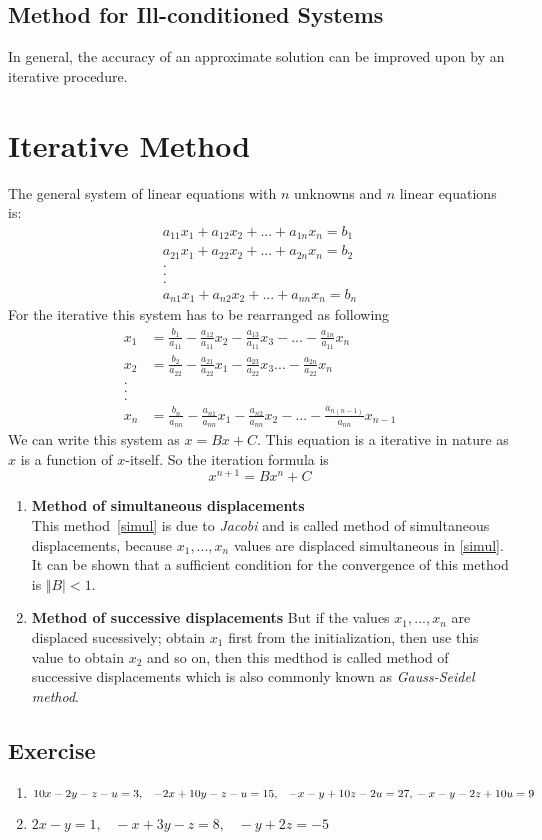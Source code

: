 \documentclass[aima203_lecturenotes_ku.tex]{subfiles}
\begin{document}
  \subsection{Method for Ill-conditioned Systems}
  In general, the accuracy of an approximate solution can be improved upon by an iterative procedure.

\section{Iterative Method}
The general system of linear equations with $n$ unknowns and $n$ linear equations is:
\begin{gather*}
    a_{11}x_1+a_{12}x_2+...+a_{1n}x_n=b_1 \\
    a_{21}x_1+a_{22}x_2+...+a_{2n}x_n=b_2 \\
    .\\
    .\\
    .\\
    a_{n1}x_1+a_{n2}x_2+...+a_{nn}x_n=b_n
  \end{gather*}
  For the iterative this system has to be rearranged as following
  \begin{align*}
    x_1 &= \frac{b_1}{a_{11}} - \frac{a_{12}}{a_{11}}x_2-\frac{a_{13}}{a_{11}}x_3-...-\frac{a_{1n}}{a_{11}}x_n \\
    x_2 &= \frac{b_2}{a_{22}} -\frac{a_{21}}{a_{22}}x_1-\frac{a_{23}}{a_{22}}x_3 ...-\frac{a_{2n}}{a_{22}}x_n \\
    .\\
    .\\
    .\\
    x_n &= \frac{b_n}{a_{nn}} - \frac{a_{n1}}{a_{nn}}x_1-\frac{a_{n2}}{a_{nn}}x_2-...-\frac{a_{n(n-1)}}{a_{nn}}x_{n-1}
  \end{align*}
  We can write this system as $x=Bx+C$. This equation is a iterative in nature as $x$ is a function of $x$-itself.
  So the iteration formula is
  \begin{equation}
    \label{simul}
    x^{n+1} = Bx^{n} + C
  \end{equation}
  \begin{enumerate}
  \item \textbf{Method of simultaneous displacements} \\[1mm]
    This method~\ref{simul} is due to \textit{Jacobi} and is called method of simultaneous displacements, because $x_1, ..., x_n$ values are displaced simultaneous in \ref{simul}. It can be shown that a sufficient condition for the convergence of this method is $\Vert B \vert < 1$.
 \item \textbf{Method of successive displacements} But if the values $x_1,...,x_n$ are displaced sucessively; obtain $x_1$ first from the initialization, then use this value to obtain $x_2$ and so on, then this medthod is called method of successive displacements which is also commonly known as \textit{Gauss-Seidel method}.
 \end{enumerate}

 \subsection{Exercise}
 \begin{enumerate}
 \item $10x-2y-z-u=3, \;\;\; -2x+10y-z-u = 15, \;\;\; -x-y+10z-2u=27, \\ -x-y-2z+10u = 9$
   \item $2x-y=1, \;\;\; -x+3y-z = 8, \;\;\; -y+2z=-5$
 \end{enumerate}
\end{document}
